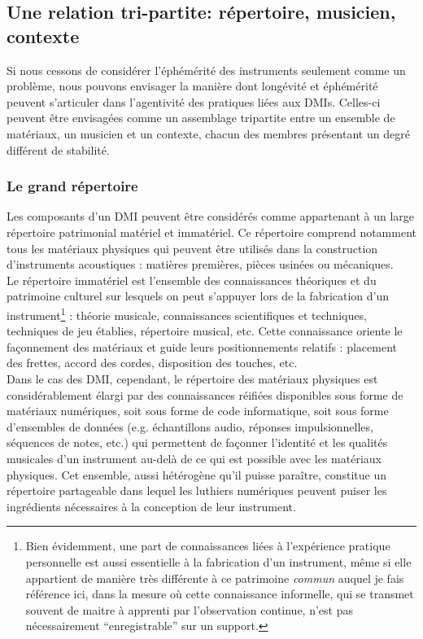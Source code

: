 \subsection{Une relation tri-partite: répertoire, musicien, contexte}

\noindent Si nous cessons de considérer l'éphémérité des instruments seulement comme un problème, nous pouvons envisager la manière dont longévité et éphémérité peuvent s'articuler dans l'agentivité des pratiques liées aux \glspl{DMI}. Celles-ci peuvent être envisagées comme un assemblage tripartite entre un ensemble de matériaux, un musicien et un contexte, chacun des membres présentant un degré différent de stabilité.

\subsubsection{Le grand répertoire}

\noindent Les composants d'un \gls{DMI} peuvent être considérés comme appartenant à un large répertoire patrimonial matériel et immatériel. Ce répertoire comprend notamment tous les matériaux physiques qui peuvent être utilisés dans la construction d'instruments acoustiques : matières premières, pièces usinées ou mécaniques. \\
\indent Le répertoire immatériel est l'ensemble des connaissances théoriques et du patrimoine culturel sur lesquels on peut s'appuyer lors de la fabrication d'un instrument\footnote{Bien évidemment, une part de connaissances liées à l'expérience pratique personnelle est aussi essentielle à la fabrication d'un instrument, même si elle appartient de manière très différente à ce patrimoine \textit{commun} auquel je fais référence ici, dans la mesure où cette connaissance informelle, qui se transmet souvent de maitre à apprenti par l'observation continue, n'est pas nécessairement ``enregistrable'' sur un support.} : théorie musicale, connaissances scientifiques et techniques, techniques de jeu établies, répertoire musical, etc. Cette connaissance oriente le façonnement des matériaux et guide leurs positionnements relatifs :  placement des frettes, accord des cordes, disposition des touches, etc.\\
\indent Dans le cas des \gls{DMI}, cependant, le répertoire des matériaux physiques est considérablement élargi par des connaissances réifiées disponibles sous forme de matériaux numériques, soit sous forme de code informatique, soit sous forme d'ensembles de données (e.g. échantillons audio, réponses impulsionnelles, séquences de notes, etc.) qui permettent de façonner l'identité et les qualités musicales d'un instrument au-delà de ce qui est possible avec les matériaux physiques. Cet ensemble, aussi hétérogène qu'il puisse paraître, constitue un répertoire partageable dans lequel les luthiers numériques peuvent puiser les ingrédients nécessaires à la conception de leur instrument.

